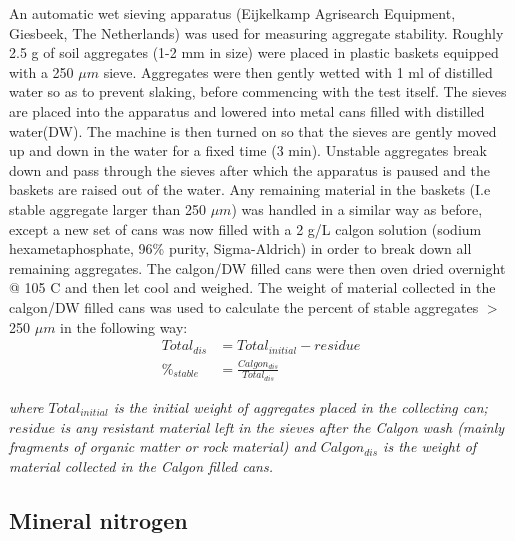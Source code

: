 \documentclass[12pt]{report}
\begin{document}
    	An automatic wet sieving apparatus (Eijkelkamp Agrisearch Equipment, Giesbeek, The Netherlands) was used for measuring aggregate stability. Roughly 2.5 g of soil aggregates (1-2 mm in size) were placed in plastic baskets equipped with a 250 $ \mu m $ sieve. Aggregates were then gently wetted with 1 ml of distilled water so as to prevent slaking, before commencing with the test itself. The sieves are  placed into the apparatus and lowered into metal cans filled with distilled water(DW). The machine is then turned on so that the sieves are gently moved up and down in the water for a fixed time (3 min). Unstable aggregates break down and pass through the sieves after which the apparatus is paused and the baskets are raised out of the water. Any remaining material in the baskets (I.e stable aggregate larger than 250 $ \mu m $) was handled in a similar way as before, except a new set of cans was now filled with a 2 g/L calgon solution (sodium hexametaphosphate, 96\% purity, Sigma-Aldrich) in order to break down all remaining aggregates. The calgon/DW filled cans were then oven dried overnight @ 105 C and  then let cool and weighed. The weight of material collected in the calgon/DW filled cans was used to calculate the percent of stable aggregates $ > $250 $ \mu m $ in the following way:\\
    	
    	\begin{align}
    	Total_{dis} &= Total_{initial} - residue\\
    	\%_{stable} &= \frac{Calgon_{dis}}{Total_{dis}}
    	\end{align}
    	
    	\begin{adjustwidth}{50pt}{50pt}
    		\begin{footnotesize}
    			\textit{where $ Total_{initial} $ is the initial weight of aggregates placed in the collecting can; $ residue $ is any resistant material left in the sieves after the Calgon wash (mainly fragments of organic matter  or rock material) and $ Calgon_{dis} $ is the weight of material collected in the Calgon filled cans. 
    			}\\
    		\end{footnotesize}
    	\end{adjustwidth} 
    
    \subsection{Mineral nitrogen}
    	
\end{document}
